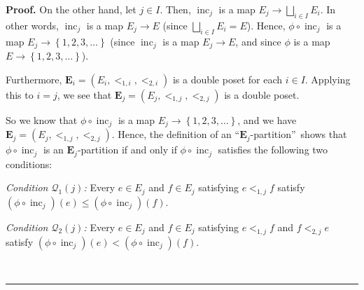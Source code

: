\documentclass[numbers=enddot,12pt,final,onecolumn,notitlepage,abstracton]{scrartcl}
\theoremstyle{definition}
\newenvironment{proof}[1][Proof]{\noindent\textbf{#1.} }{\ \rule{0.5em}{0.5em}}
\newenvironment{verlong}{}{}
\begin{document}
\begin{verlong}
\begin{footnotesize}
\begin{proof}
On the other hand, let $j\in I$. Then, $\operatorname*{inc}\nolimits_{j}$ is a
map $E_{j}\rightarrow\bigsqcup_{i\in I}E_{i}$. In other words,
$\operatorname*{inc}\nolimits_{j}$ is a map $E_{j}\rightarrow E$ (since
$\bigsqcup_{i\in I}E_{i}=E$). Hence, $\phi\circ\operatorname*{inc}%
\nolimits_{j}$ is a map $E_{j}\rightarrow\left\{  1,2,3,\ldots\right\}  $
(since $\operatorname*{inc}\nolimits_{j}$ is a map $E_{j}\rightarrow E$, and
since $\phi$ is a map $E\rightarrow\left\{  1,2,3,\ldots\right\}  $).

Furthermore, $\mathbf{E}_{i}=\left(  E_{i},<_{1,i},<_{2,i}\right)  $ is a
double poset for each $i\in I$. Applying this to $i=j$, we see that
$\mathbf{E}_{j}=\left(  E_{j},<_{1,j},<_{2,j}\right)  $ is a double poset.

So we know that $\phi\circ\operatorname*{inc}\nolimits_{j}$ is a map
$E_{j}\rightarrow\left\{  1,2,3,\ldots\right\}  $, and we have $\mathbf{E}%
_{j}=\left(  E_{j},<_{1,j},<_{2,j}\right)  $. Hence, the definition of an
\textquotedblleft$\mathbf{E}_{j}$-partition\textquotedblright\ shows that
$\phi\circ\operatorname*{inc}\nolimits_{j}$ is an $\mathbf{E}_{j}$-partition
if and only if $\phi\circ\operatorname*{inc}\nolimits_{j}$ satisfies the
following two conditions:

\textit{Condition $\mathcal{Q}$}$_{1}\left(  j\right)  $\textit{:} Every $e\in
E_{j}$ and $f\in E_{j}$ satisfying $e<_{1,j}f$ satisfy $\left(  \phi
\circ\operatorname*{inc}\nolimits_{j}\right)  \left(  e\right)  \leq\left(
\phi\circ\operatorname*{inc}\nolimits_{j}\right)  \left(  f\right)  $.

\textit{Condition $\mathcal{Q}$}$_{2}\left(  j\right)  $\textit{:} Every $e\in
E_{j}$ and $f\in E_{j}$ satisfying $e<_{1,j}f$ and $f<_{2,j}e$ satisfy
$\left(  \phi\circ\operatorname*{inc}\nolimits_{j}\right)  \left(  e\right)
<\left(  \phi\circ\operatorname*{inc}\nolimits_{j}\right)  \left(  f\right)  $.


\end{proof}
\end{footnotesize}
\end{verlong}
\end{document}
